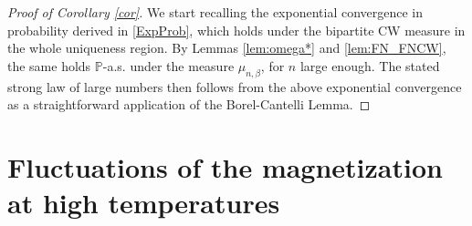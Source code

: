 \documentclass[11pt,oneside]{amsart}
\numberwithin{equation}{section}  %
\theoremstyle{plain}
\theoremstyle{remark}
\begin{document}
\begin{proof}[Proof of Corollary \ref{cor}] 
We start recalling the exponential convergence in probability derived in \eqref{ExpProb}, which holds under the bipartite CW measure in the whole uniqueness region.
By Lemmas \ref{lem:omega*} and \ref{lem:FN_FNCW}, the same holds $\mathbb{P}$-a.s. under the measure
$\mu_{n,\beta}$, for $n$ large enough. The stated strong law of large numbers then follows from the above exponential convergence as a straightforward application of the Borel-Cantelli Lemma. 
\end{proof}





\section{Fluctuations of the magnetization at high temperatures}
\label{sec:fluctuations}
\end{document}

